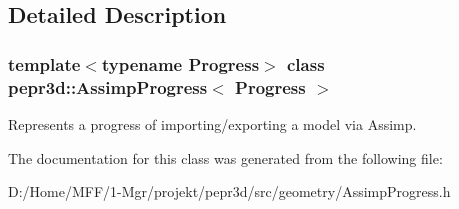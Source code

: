 \subsection{Detailed Description}
\subsubsection*{template$<$typename Progress$>$\newline
class pepr3d\+::\+Assimp\+Progress$<$ Progress $>$}

Represents a progress of importing/exporting a model via Assimp. 

The documentation for this class was generated from the following file\+:\begin{DoxyCompactItemize}
\item 
D\+:/\+Home/\+M\+F\+F/1-\/\+Mgr/projekt/pepr3d/src/geometry/Assimp\+Progress.\+h\end{DoxyCompactItemize}
